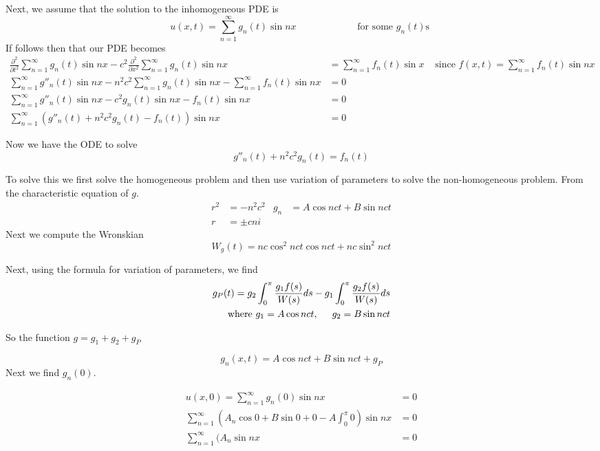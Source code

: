 \documentclass{article}
\begin{document}
Next, we assume that the solution to the inhomogeneous PDE is 
\[
u(x,t)=\sum_{n=1}^\infty g_n(t) \sin nx  \hspace{1in} \text{ for some \(g_n(t)\)s }
\]
If follows then that our PDE becomes
\begin{align*}
\frac{ \partial^2}{\partial t^2} \sum_{n=1}^\infty g_n(t) \sin nx - c^2 \frac{\partial^2}{\partial x^2}\sum_{n=1}^\infty g_n(t) \sin nx &= \sum_{n=1}^\infty f_n(t) \sin x &\text{ since } f(x,t) = \sum_{n=1}^\infty f_n(t)\sin nx\\
\sum_{n=1}^\infty g''_n(t) \sin nx-n^2c^2 \sum_{n=1}^\infty g_n(t) \sin nx - \sum_{n=1}^\infty f_n(t)\sin nx&=0 \\
\sum_{n=1}^\infty g''_n(t) \sin nx-c^2g_n(t) \sin nx - f_n(t)\sin nx&=0 \\
\sum_{n=1}^\infty (g''_n(t) +n^2c^2g_n(t) - f_n(t))\sin nx&=0
\end{align*}


Now we have the ODE to solve
\[g''_n(t) +n^2c^2g_n(t) = f_n(t) \]

To solve this we first solve the homogeneous problem and then use variation of parameters to solve the non-homogeneous problem. From the characteristic equation of \(g\). 
\begin{align*}
r^2&= -n^2c^2  &               g_n &= A\cos nct + B\sin nct                     \\
r&= \pm cni &                    &
\end{align*}
Next we compute the Wronskian
\[W_g(t) =nc \cos^2 nct \cos nct + nc\sin^2 nct  \]

Next, using the formula for variation of parameters, we find
\begin{align*}
g_P(t) = g_2 \int_0^\pi \frac{g_1 f(s)}{W(s)} ds-g_1 \int_0^\pi \frac{g_2 f(s)}{W(s) } ds\\
\text{ where } g_1 = A \cos nct, \hspace{5mm}  g_2 = B\sin nct 
\end{align*}

So the function \(g= g_1+g_2 + g_P\) 

\[ g_n(x,t) = A\cos nct + B\sin nct + g_P \]
\newpage
Next we find \(g_n(0) \). 

\begin{align*}
u(x,0) =  \sum_{n=1}^\infty g_n(0) \sin nx  &=0\\ 
\sum_{n=1}^\infty ( A_n \cos 0 + B\sin 0 + 0 - A\int_0^\pi  0    )\sin nx      &=0 \\ 
\sum_{n=1}^\infty ( A_n \sin nx &=0
\end{align*}
\end{document}
